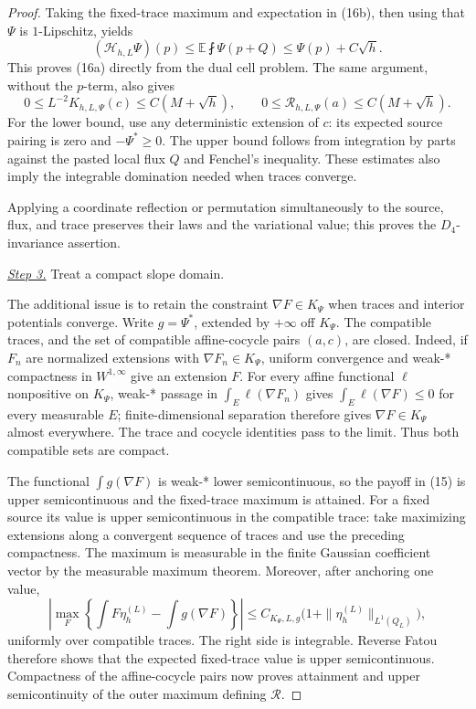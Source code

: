 \documentclass{smfart}
\theoremstyle{definition}
\newcommand{\1}{\mathbf 1}
\begin{document}
\begin{proof}
Taking the fixed-trace maximum and expectation in (16b), then using that
$\Psi$ is $1$-Lipschitz, yields
\begin{equation}
(\mathcal H_ {h,L}\Psi)(p)
\leq\mathbb E\fint\Psi(p+Q)\leq\Psi(p)+C\sqrt h.
\tag{16c}
\end{equation}
This proves (16a) directly from the dual cell problem.
The same argument, without the $p$-term, also gives
\begin{equation}
0\leq L^{-2}K_ {h,L,\Psi}(c)\leq C(M+\sqrt h),
\qquad 0\leq \mathcal R_ {h,L,\Psi}(a)\leq C(M+\sqrt h).
\tag{16d}
\end{equation}
For the lower bound, use any deterministic extension of $c$: its
expected source pairing is zero and $-\Psi^*\geq0$.  The upper bound
follows from integration by parts against the pasted local flux $Q$
and Fenchel's inequality.  These estimates also imply the integrable
domination needed when traces converge.

Applying a coordinate reflection or permutation simultaneously to the
source, flux, and trace preserves their laws and the variational value;
this proves the $D_ 4$-invariance assertion.

\smallskip\noindent
\underline{\textit{Step 3.}} Treat a compact slope domain.

The additional issue is to retain the constraint
$\nabla F\in K_\Psi$ when traces and interior potentials converge.
Write $g=\Psi^*$, extended by
$+\infty$ off $K_ \Psi$.  The compatible traces, and the set of
compatible affine-cocycle pairs $(a,c)$, are closed.  Indeed, if
$F_ n$ are normalized extensions with
$\nabla F_ n\in K_ \Psi$, uniform convergence and weak-* compactness in
$W^{1,\infty}$ give an extension $F$.  For every affine functional
$\ell$ nonpositive on $K_ \Psi$, weak-* passage in
$\int_ E\ell(\nabla F_ n)$ gives
$\int_ E\ell(\nabla F)\leq0$ for every measurable $E$;
finite-dimensional separation therefore gives
$\nabla F\in K_ \Psi$ almost everywhere.  The trace and cocycle
identities pass to the limit.  Thus both compatible sets are compact.

The functional $\int g(\nabla F)$ is weak-* lower semicontinuous, so
the payoff in (15) is upper semicontinuous and the fixed-trace maximum
is attained.  For a fixed source its value is upper semicontinuous in
the compatible trace: take maximizing extensions along a convergent
sequence of traces and use the preceding compactness.  The maximum is
measurable in the finite Gaussian coefficient vector by the measurable
maximum theorem.  Moreover, after anchoring one value,
\begin{equation}
\left|\max_ F\left\{\int F\eta_ h^{(L)}-\int g(\nabla F)\right\}\right|
\leq C_ {K_ \Psi,L,g}\bigl(1+\|\eta_ h^{(L)}\|_ {L^1(Q_ L)}\bigr),
\tag{16s}
\end{equation}
uniformly over compatible traces.  The right side is integrable.
Reverse Fatou therefore shows that the expected fixed-trace value is
upper semicontinuous.  Compactness of the affine-cocycle pairs now
proves attainment and upper semicontinuity of the outer maximum
defining $\mathcal R$.


\end{proof}
\end{document}
